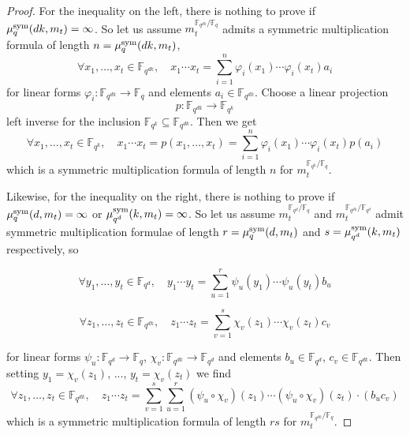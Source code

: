 \begin{proof}
For the inequality on the left, there is nothing to prove if $\mu^{\textrm{sym}}_q(dk,m_t)=\infty$.
So let us assume $m_t^{\mathbb{F}_{q^{dk}}/\mathbb{F}_{q}}$ admits a symmetric multiplication formula of length $n=\mu^{\textrm{sym}}_q(dk,m_t)$, \ie
\[\forall x_1,\dots,x_t\in\mathbb{F}_{q^{dk}},\quad x_1\cdots x_t = \sum_{i=1}^{n}\varphi_i(x_1)\cdots\varphi_i(x_t)a_i \]
for linear forms $\varphi_i:\mathbb{F}_{q^{dk}}\to\mathbb{F}_{q}$ and elements $a_i\in\mathbb{F}_{q^{dk}}$.
Choose a linear projection
\[ p:\mathbb{F}_{q^{dk}}\to\mathbb{F}_{q^{k}} \]
left inverse for the inclusion $\mathbb{F}_{q^{k}}\subseteq\mathbb{F}_{q^{dk}}$.
Then we get
\[\forall x_1,\dots,x_t\in\mathbb{F}_{q^{k}},\quad x_1\cdots x_t = p(x_1,\dots,x_t) = \sum_{i=1}^{n}\varphi_i(x_1)\cdots\varphi_i(x_t)p(a_i) \]
which is a symmetric multiplication formula of length $n$ for $m_t^{\mathbb{F}_{q^{k}}/\mathbb{F}_{q}}$.

Likewise, for the inequality on the right, there is nothing to prove if $\mu^{\textrm{sym}}_q(d,m_t)=\infty$ or $\mu^{\textrm{sym}}_{q^d}(k,m_t)=\infty$.
So let us assume $m_t^{\mathbb{F}_{q^{d}}/\mathbb{F}_{q}}$ and $m_t^{\mathbb{F}_{q^{dk}}/\mathbb{F}_{q^{d}}}$ admit symmetric multiplication formulae of length $r=\mu^{\textrm{sym}}_q(d,m_t)$ and $s=\mu^{\textrm{sym}}_{q^d}(k,m_t)$ respectively, so
\vspace{-.5\baselineskip}

\[\forall y_1,\dots,y_t\in\mathbb{F}_{q^{d}},\quad y_1\cdots y_t = \sum_{u=1}^{r}\psi_u(y_1)\cdots\psi_u(y_t)b_u \]
\vspace{-1.5\baselineskip}

\[\forall z_1,\dots,z_t\in\mathbb{F}_{q^{dk}},\quad z_1\cdots z_t = \sum_{v=1}^{s}\chi_v(z_1)\cdots\chi_v(z_t)c_v \]
\vspace{-.5\baselineskip}

\noindent for linear forms $\psi_u:\mathbb{F}_{q^{d}}\to\mathbb{F}_{q}$, $\chi_v:\mathbb{F}_{q^{dk}}\to\mathbb{F}_{q^{d}}$ and elements $b_u\in\mathbb{F}_{q^{d}}$, $c_v\in\mathbb{F}_{q^{dk}}$.
Then setting $y_1=\chi_v(z_1)$, ..., $y_t=\chi_v(z_t)$ we find
\[\forall z_1,\dots,z_t\in\mathbb{F}_{q^{dk}},\quad z_1\cdots z_t = \sum_{v=1}^{s}\sum_{u=1}^{r}(\psi_u\circ\chi_v)(z_1)\cdots(\psi_u\circ\chi_v)(z_t)\cdot(b_uc_v) \]
which is a symmetric multiplication formula of length $rs$ for $m_t^{\mathbb{F}_{q^{dk}}/\mathbb{F}_{q}}$.
\end{proof}


